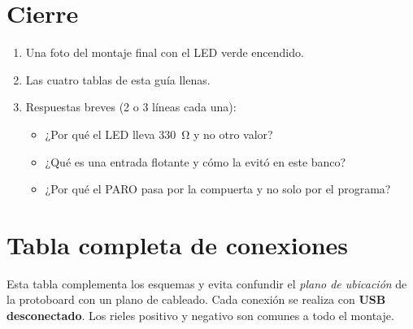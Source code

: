 \documentclass[11pt,a4paper]{article}
\begin{document}
\section*{Cierre}
\begin{evidencia}
\begin{enumerate}[leftmargin=*]
  \item Una foto del montaje final con el LED verde encendido.
  \item Las cuatro tablas de esta guía llenas.
  \item Respuestas breves (2 o 3 líneas cada una):
  \begin{itemize}
    \item ¿Por qué el LED lleva \SI{330}{\ohm} y no otro valor?
    \item ¿Qué es una entrada flotante y cómo la evitó en este banco?
    \item ¿Por qué el PARO pasa por la compuerta y no solo por el programa?
  \end{itemize}
\end{enumerate}
\end{evidencia}



\FloatBarrier
\appendix
\section{Tabla completa de conexiones}\label{sec:conexiones}

Esta tabla complementa los esquemas y evita confundir el \emph{plano de ubicación} de la protoboard con un plano de cableado. Cada conexión se realiza con \textbf{USB desconectado}. Los rieles positivo y negativo son comunes a todo el montaje.
\end{document}
